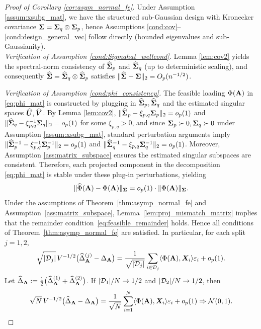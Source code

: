 \documentclass[authoryear,preprint,review,12pt]{elsarticle}
\begin{document}
\begin{proof}[Proof of Corollary \ref{cor:asym_normal_fe}]
	Under Assumption \ref{assum:xsubg_mat}, we have the structured sub-Gaussian design with Kronecker covariance
	$\mathbf{ \Sigma}=\mathbf{ \Sigma}_q\otimes \mathbf{ \Sigma}_p$, hence Assumptions \ref{cond:cov}--\ref{cond:design_general_vec} follow directly (bounded eigenvalues and sub-Gaussianity).\\
	\noindent\emph{Verification of Assumption \ref{cond:Sigmahat_wellcond}.} 
	Lemma \ref{lem:cov2} yields the spectral-norm consistency of $\widehat{\mathbf{ \Sigma}}_p$ and $\widehat{\mathbf{ \Sigma}}_q$ (up to deterministic scaling), and consequently $\widehat{\mathbf{ \Sigma}}=\widehat{\mathbf{ \Sigma}}_q\otimes \widehat{\mathbf{ \Sigma}}_p$ satisfies
	$\|\widehat{\mathbf{ \Sigma}}-\mathbf{ \Sigma}\|_2=O_p(n^{-1/2})$.
	
	\noindent\emph{Verification of Assumption \ref{cond:phi_consistency}.} 
	The feasible loading  $\Phi(\mathbf{A})$ in \eqref{eq:phi_mat} is constructed by plugging in $\widehat{\mathbf{ \Sigma}}_p,\widehat{\mathbf{ \Sigma}}_q$ and the estimated singular spaces
	$\widehat {\boldsymbol U},\widehat {\boldsymbol V}$.	 
	By Lemma \ref{lem:cov2}, $\|\widehat{\mathbf{ \Sigma}}_p-\xi_{p,q}\mathbf{ \Sigma}_p\|_2=o_p(1)$ and $\|\widehat{\mathbf{ \Sigma}}_q-\xi_{p,q}^{-1}\mathbf{ \Sigma}_q\|_2=o_p(1)$ for some $\xi_{p,q}>0$, and since
	$\mathbf{ \Sigma}_p\succ0,\mathbf{ \Sigma}_q\succ0$ under Assumption \ref{assum:xsubg_mat}, standard perturbation arguments imply
	$\|\widehat{\mathbf{ \Sigma}}_p^{-1}-\xi_{p,q}^{-1}\mathbf{ \Sigma}_p^{-1}\|_2=o_p(1)$ and $\|\widehat{\mathbf{ \Sigma}}_q^{-1}-\xi_{p,q}\mathbf{ \Sigma}_q^{-1}\|_2=o_p(1)$.
	Moreover, Assumption \ref{ass:matrix_subspace} ensures the estimated singular subspaces are consistent.
	Therefore, each projected component in the decomposition \eqref{eq:phi_mat} is stable under these plug-in perturbations, yielding
	\[
	\|\widehat\Phi(\mathbf{A})-\Phi(\mathbf{A})\|_{\mathbf{ \Sigma}}
	=o_p(1)\cdot \|\Phi(\mathbf{A})\|_{\mathbf{ \Sigma}}.
	\]  
	{  Under the assumptions of Theorem~\ref{thm:asymp_normal_fe} and Assumption~\ref{ass:matrix_subspace},
		Lemma~\ref{lem:proj_mismatch_matrix} implies that the remainder condition~\eqref{eq:feasible_remainder} holds.
		Hence all conditions of Theorem~\ref{thm:asymp_normal_fe} are satisfied. In particular, for each split $j=1,2$,
		\[
		\sqrt{|\mathcal{D}_j|}\,V^{-1/2}\bigl(\widehat\Delta_{\mathbf{A}}^{(j)}-\Delta_{\mathbf{A}}\bigr)
		=
		\frac{1}{\sqrt{|\mathcal{D}_j|}}\sum_{i\in \mathcal{D}_j}\langle \Phi(\mathbf{A}),\boldsymbol X_i\rangle \varepsilon_i
		+o_p(1).
		\]
		Let $\widehat\Delta_{\mathbf{A}}:=\frac{1}{2}\bigl(\widehat\Delta_{\mathbf{A}}^{(1)}+\widehat\Delta_{\mathbf{A}}^{(2)}\bigr)$.
		If $|\mathcal{D}_1|/N\to 1/2$ and $|\mathcal{D}_2|/N\to 1/2$, then
		\[
		\sqrt{N}\,V^{-1/2}\bigl(\widehat\Delta_{\mathbf{A}}-\Delta_{\mathbf{A}}\bigr)
		=
		\frac{1}{\sqrt{N}}\sum_{i=1}^N \langle \Phi(\mathbf{A}),\boldsymbol X_i\rangle \varepsilon_i
		+o_p(1)
		\Rightarrow \mathcal{N}(0,1).
		\]}
\end{proof}
\end{document}
